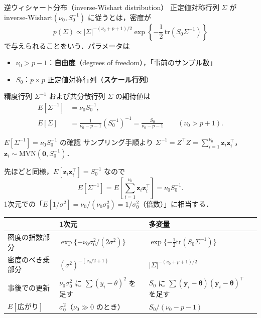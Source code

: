\documentclass[lualatex,ja=standard,a4paper,12pt]{bxjsarticle}
\newcommand{\mvn}{\mathrm{MVN}}
\newcommand{\IW}{\mathrm{inverse\text{-}Wishart}}
\newcommand{\tr}{\mathrm{tr}}
\begin{document}
\begin{defbox}{逆ウィシャート分布（inverse-Wishart distribution）}
正定値対称行列 $\Sigma$ が $\IW(\nu_0, S_0^{-1})$ に従うとは，密度が
\[
  p(\Sigma) \propto
  |\Sigma|^{-(\nu_0 + p + 1)/2}
  \exp\!\left\{-\frac{1}{2}\,\tr\!\left(S_0 \Sigma^{-1}\right)\right\}
\]
で与えられることをいう．パラメータは
\begin{itemize}
  \item $\nu_0 > p - 1$：\textbf{自由度}（degrees of freedom），「事前のサンプル数」
  \item $S_0$：$p \times p$ 正定値対称行列（\textbf{スケール行列}）
\end{itemize}
精度行列 $\Sigma^{-1}$ および共分散行列 $\Sigma$ の期待値は
\begin{align*}
  E[\Sigma^{-1}] &= \nu_0 S_0^{-1}, \\
  E[\Sigma] &= \frac{1}{\nu_0 - p - 1}(S_0^{-1})^{-1} = \frac{S_0}{\nu_0 - p - 1} \qquad (\nu_0 > p + 1).
\end{align*}
\end{defbox}

\begin{derivbox}{$E[\Sigma^{-1}] = \nu_0 S_0^{-1}$ の確認}
サンプリング手順より $\Sigma^{-1} = Z^\top Z = \sum_{i=1}^{\nu_0}\bm{z}_i\bm{z}_i^\top$，
$\bm{z}_i \sim \mvn(\bm{0}, S_0^{-1})$．

先ほどと同様，$E[\bm{z}_i\bm{z}_i^\top] = S_0^{-1}$ なので
\[
  E[\Sigma^{-1}] = E\!\left[\sum_{i=1}^{\nu_0}\bm{z}_i\bm{z}_i^\top\right] = \nu_0 S_0^{-1}.
\]
1次元での「$E[1/\sigma^2] = \nu_0/(\nu_0\sigma_0^2) = 1/\sigma_0^2$（倍数）」に相当する．
\end{derivbox}

\begin{center}
\renewcommand{\arraystretch}{1.5}
\begin{tabular}{lll}
\toprule
 & 1次元 & 多変量 \\
\midrule
密度の指数部分 & $\exp\{-\nu_0\sigma_0^2/(2\sigma^2)\}$ & $\exp\{-\frac12\tr(S_0\Sigma^{-1})\}$ \\
密度のべき乗部分 & $(\sigma^2)^{-(\nu_0/2+1)}$ & $|\Sigma|^{-(\nu_0+p+1)/2}$ \\
事後での更新 & $\nu_0\sigma_0^2$ に $\sum(y_i-\theta)^2$ を足す & $S_0$ に $\sum(\bm{y}_i-\bm{\theta})(\bm{y}_i-\bm{\theta})^\top$ を足す \\
$E[\text{広がり}]$ & $\sigma_0^2$（$\nu_0 \gg 0$ のとき） & $S_0/(\nu_0-p-1)$ \\
\bottomrule
\end{tabular}
\end{center}
\end{document}
